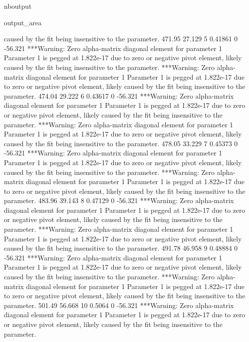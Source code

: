 \documentclass[letterpaper,10pt,english]{sphinxmanual}
\begin{document}
\begin{sphinxuseclass}{nboutput}
{\begin{sphinxuseclass}{output_area}
\begin{sphinxuseclass}{}
\begin{sphinxVerbatim}[commandchars=\\\{\}]
 caused by the fit being insensitive to the parameter.
          471.95      27.129    5     0.41861    0     -56.321
***Warning: Zero alpha-matrix diagonal element for parameter 1
 Parameter 1 is pegged at 1.822e-17 due to zero or negative pivot element, likely
 caused by the fit being insensitive to the parameter.
***Warning: Zero alpha-matrix diagonal element for parameter 1
 Parameter 1 is pegged at 1.822e-17 due to zero or negative pivot element, likely
 caused by the fit being insensitive to the parameter.
          474.04      29.222    6     0.43617    0     -56.321
***Warning: Zero alpha-matrix diagonal element for parameter 1
 Parameter 1 is pegged at 1.822e-17 due to zero or negative pivot element, likely
 caused by the fit being insensitive to the parameter.
***Warning: Zero alpha-matrix diagonal element for parameter 1
 Parameter 1 is pegged at 1.822e-17 due to zero or negative pivot element, likely
 caused by the fit being insensitive to the parameter.
          478.05      33.229    7     0.45373    0     -56.321
***Warning: Zero alpha-matrix diagonal element for parameter 1
 Parameter 1 is pegged at 1.822e-17 due to zero or negative pivot element, likely
 caused by the fit being insensitive to the parameter.
***Warning: Zero alpha-matrix diagonal element for parameter 1
 Parameter 1 is pegged at 1.822e-17 due to zero or negative pivot element, likely
 caused by the fit being insensitive to the parameter.
          483.96      39.143    8     0.47129    0     -56.321
***Warning: Zero alpha-matrix diagonal element for parameter 1
 Parameter 1 is pegged at 1.822e-17 due to zero or negative pivot element, likely
 caused by the fit being insensitive to the parameter.
***Warning: Zero alpha-matrix diagonal element for parameter 1
 Parameter 1 is pegged at 1.822e-17 due to zero or negative pivot element, likely
 caused by the fit being insensitive to the parameter.
          491.78      46.958    9     0.48884    0     -56.321
***Warning: Zero alpha-matrix diagonal element for parameter 1
 Parameter 1 is pegged at 1.822e-17 due to zero or negative pivot element, likely
 caused by the fit being insensitive to the parameter.
***Warning: Zero alpha-matrix diagonal element for parameter 1
 Parameter 1 is pegged at 1.822e-17 due to zero or negative pivot element, likely
 caused by the fit being insensitive to the parameter.
          501.49      56.668   10      0.5064    0     -56.321
***Warning: Zero alpha-matrix diagonal element for parameter 1
 Parameter 1 is pegged at 1.822e-17 due to zero or negative pivot element, likely
 caused by the fit being insensitive to the parameter.

\end{sphinxVerbatim}
\end{sphinxuseclass}
\end{sphinxuseclass}}
\end{sphinxuseclass}
\end{document}
